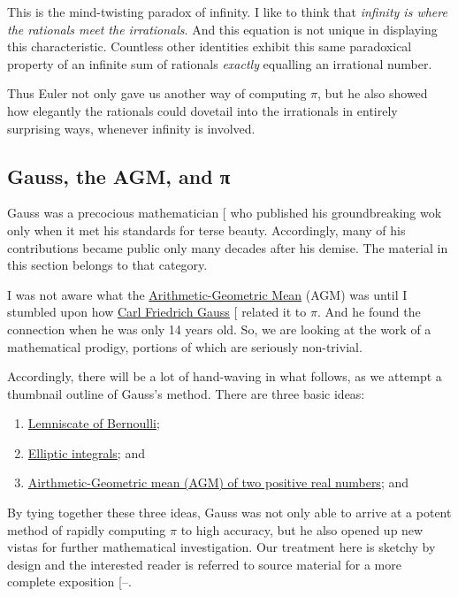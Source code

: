 \documentclass[
  a4paper,
]{article}
\begin{document}
This is the mind-twisting paradox of infinity. I like to think that
\emph{infinity is where the rationals meet the irrationals}. And this
equation is not unique in displaying this characteristic. Countless
other identities exhibit this same paradoxical property of an infinite
sum of rationals \emph{exactly} equalling an irrational number.

Thus Euler not only gave us another way of computing \(\pi\), but he
also showed how elegantly the rationals could dovetail into the
irrationals in entirely surprising ways, whenever infinity is involved.

\subsection{Gauss, the AGM, and π}\label{gauss-the-agm-and-ux3c0}

Gauss was a precocious mathematician {[}\citeproc{ref-gauss-bio}{29}{]}
who published his groundbreaking wok only when it met his standards for
terse beauty. Accordingly, many of his contributions became public only
many decades after his demise. The material in this section belongs to
that category.

I was not aware what the
\href{https://mathworld.wolfram.com/Arithmetic-GeometricMean.html}{Arithmetic-Geometric
Mean} (AGM) was until I stumbled upon how
\href{https://en.wikipedia.org/wiki/Carl_Friedrich_Gauss}{Carl Friedrich
Gauss} {[}\citeproc{ref-gauss-wiki}{30}{]} related it to \(\pi\). And he
found the connection when he was only 14 years old. So, we are looking
at the work of a mathematical prodigy, portions of which are seriously
non-trivial.

Accordingly, there will be a lot of hand-waving in what follows, as we
attempt a thumbnail outline of Gauss's method. There are three basic
ideas:

\begin{enumerate}
\def\labelenumi{(\alph{enumi})}
\item
  \href{https://mathworld.wolfram.com/Lemniscate.html}{Lemniscate of
  Bernoulli};
\item
  \href{https://en.wikipedia.org/wiki/Elliptic_integral}{Elliptic
  integrals}; and
\item
  \href{https://en.wikipedia.org/wiki/Arithmetic\%E2\%80\%93geometric_mean}{Airthmetic-Geometric
  mean (AGM) of two positive real numbers}; and
\end{enumerate}

By tying together these three ideas, Gauss was not only able to arrive
at a potent method of rapidly computing \(\pi\) to high accuracy, but he
also opened up new vistas for further mathematical investigation. Our
treatment here is sketchy by design and the interested reader is
referred to source material for a more complete exposition
{[}--\citeproc{ref-langton-2001}{33}{]}.
\end{document}
